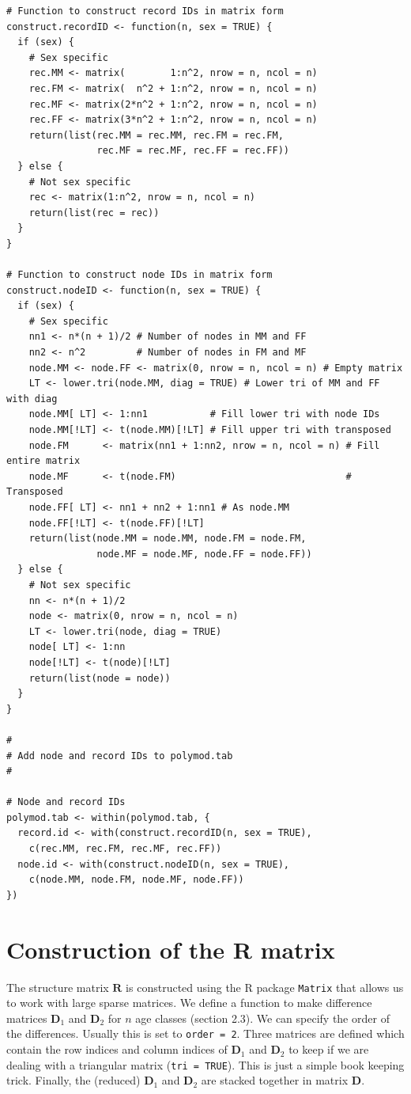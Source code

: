 \documentclass[aoas,preprint]{imsart}
\numberwithin{equation}{section}
\begin{document}
\begin{verbatim}
# Function to construct record IDs in matrix form
construct.recordID <- function(n, sex = TRUE) {
  if (sex) {
    # Sex specific
    rec.MM <- matrix(        1:n^2, nrow = n, ncol = n)
    rec.FM <- matrix(  n^2 + 1:n^2, nrow = n, ncol = n)
    rec.MF <- matrix(2*n^2 + 1:n^2, nrow = n, ncol = n)
    rec.FF <- matrix(3*n^2 + 1:n^2, nrow = n, ncol = n)
    return(list(rec.MM = rec.MM, rec.FM = rec.FM,
                rec.MF = rec.MF, rec.FF = rec.FF))
  } else {
    # Not sex specific
    rec <- matrix(1:n^2, nrow = n, ncol = n)
    return(list(rec = rec))
  }
}

# Function to construct node IDs in matrix form
construct.nodeID <- function(n, sex = TRUE) {
  if (sex) {
    # Sex specific
    nn1 <- n*(n + 1)/2 # Number of nodes in MM and FF
    nn2 <- n^2         # Number of nodes in FM and MF
    node.MM <- node.FF <- matrix(0, nrow = n, ncol = n) # Empty matrix
    LT <- lower.tri(node.MM, diag = TRUE) # Lower tri of MM and FF with diag
    node.MM[ LT] <- 1:nn1           # Fill lower tri with node IDs
    node.MM[!LT] <- t(node.MM)[!LT] # Fill upper tri with transposed
    node.FM      <- matrix(nn1 + 1:nn2, nrow = n, ncol = n) # Fill entire matrix
    node.MF      <- t(node.FM)                              # Transposed
    node.FF[ LT] <- nn1 + nn2 + 1:nn1 # As node.MM
    node.FF[!LT] <- t(node.FF)[!LT]
    return(list(node.MM = node.MM, node.FM = node.FM,
                node.MF = node.MF, node.FF = node.FF))
  } else {
    # Not sex specific
    nn <- n*(n + 1)/2
    node <- matrix(0, nrow = n, ncol = n)
    LT <- lower.tri(node, diag = TRUE)
    node[ LT] <- 1:nn
    node[!LT] <- t(node)[!LT]
    return(list(node = node))
  }
}

#
# Add node and record IDs to polymod.tab
#

# Node and record IDs
polymod.tab <- within(polymod.tab, {
  record.id <- with(construct.recordID(n, sex = TRUE),
    c(rec.MM, rec.FM, rec.MF, rec.FF))
  node.id <- with(construct.nodeID(n, sex = TRUE),
    c(node.MM, node.FM, node.MF, node.FF))
})
\end{verbatim}

\section{Construction of the R matrix}

The structure matrix $\bm{R}$ is constructed using the R package \texttt{Matrix} that allows us to work with large sparse matrices. We define a function to make difference matrices $\bm{D}_1$ and $\bm{D}_2$ for $n$ age classes (section 2.3). We can specify the order of the differences. Usually this is set to \texttt{order = 2}. Three matrices are defined which contain the row indices and column indices of $\bm{D}_1$ and $\bm{D}_2$ to keep if we are dealing with a triangular matrix (\texttt{tri = TRUE}). This is just a simple book keeping trick. Finally, the (reduced) $\bm{D}_1$ and $\bm{D}_2$ are stacked together in matrix $\bm{D}$.
\end{document}
